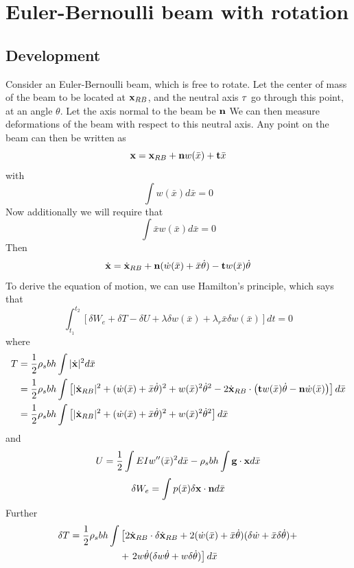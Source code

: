 \documentclass{article}
\begin{document}
\section{Euler-Bernoulli beam with rotation}
\subsection{Development}
Consider an Euler-Bernoulli beam, which is free to rotate.  
Let the center of mass of the beam to be located at ${\bf x}_{RB}$, and the neutral axis ${\bf \tau}$ go through this point, at an angle $\theta$.  
Let the axis normal to the beam be ${\bf n}$
We can then measure deformations of the beam with respect to this neutral axis.
Any point on the beam can then be written as 
\begin{equation} {\bf x} = {\bf x}_{RB} + {\bf n}w(\bar{x}) + {\bf t} \bar{x} \label{eq:eq6100} \end{equation}
with 
\[ \int w(\bar{x}) d\bar{x} = 0 \]
Now additionally we will require that 
\[ \int \bar{x} w(\bar{x}) d\bar{x} = 0 \] 
Then
\[ \dot{\bf x} = \dot{\bf x}_{RB} + {\bf n}(\dot{w}(\bar{x}) + \bar{x}\dot{\theta}) - {\bf t}w(\bar{x})\dot{\theta} \]
To derive the equation of motion, we can use Hamilton's principle, which says that
\begin{equation} \int_{t_1}^{t_2} \left[ \delta W_e + \delta T - \delta U + \lambda \delta w(\bar{x}) + \lambda_r \bar{x} \delta w(\bar{x}) \right] dt = 0  \label{eq:eq6200} \end{equation}
where
\begin{align*}
T &= \frac{1}{2}\rho_s b h \int |\dot{\bf x}|^2 d\bar{x}  \\
  &= \frac{1}{2}\rho_s b h \int \left[ |\dot{\bf x}_{RB}|^2 + (\dot{w}(\bar{x}) + \bar{x}\dot{\theta}) ^2 + w(\bar{x})^2\dot{\theta}^2-2\dot{\bf x}_{RB}\cdot\left( {\bf t}w(\bar{x})\dot{\theta}- {\bf n}\dot{w}(\bar{x})\right)\right] d\bar{x} \\
  &= \frac{1}{2}\rho_s b h \int \left[ |\dot{\bf x}_{RB}|^2 + (\dot{w}(\bar{x}) + \bar{x}\dot{\theta}) ^2 + w(\bar{x})^2\dot{\theta}^2 \right] d\bar{x}
\end{align*}
and
\[ U = \frac{1}{2}\int EI w''(\bar{x})^2 d\bar{x} - \rho_s b h \int {\bf g} \cdot {\bf x} d\bar{x} \]
\[ \delta W_e = \int p(\bar{x}) \delta {\bf x}\cdot{\bf n} d\bar{x} \]
Further 
\begin{align*}
\delta T = \frac{1}{2}\rho_s b h \int &\left[2 \dot{\bf x}_{RB} \cdot \delta \dot{\bf x}_{RB} + 2(\dot{w}(\bar{x}) + \bar{x}\dot{\theta}) (\delta \dot{w}+\bar{x}\delta\dot{\theta})+ \right. \\
&+\left. 2w\dot{\theta}(\delta w \dot{\theta} + w \delta \dot{\theta}) \right] d\bar{x}
\end{align*}
\end{document}
